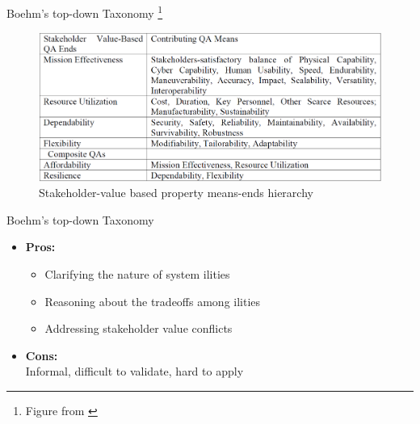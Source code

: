\documentclass[xcolor=x11names,compress]{beamer}
\renewcommand{\(}{\begin{columns}}
\renewcommand{\)}{\end{columns}}
\newcommand{\<}[1]{\begin{column}{#1}}
\renewcommand{\>}{\end{column}}
\begin{document}
\begin{frame}{Boehm's top-down Taxonomy \footnote{Figure from \cite{Boehm:ontology}}}
\begin{figure}
\includegraphics[scale=0.28]{figures/hierarchy}
\caption{Stakeholder-value based property means-ends hierarchy}
\end{figure}
\end{frame}


\begin{frame}{Boehm's top-down Taxonomy}
\begin{itemize}
\item \textbf{Pros:}
	\begin{itemize}
		\item Clarifying the nature of system ilities
		\item Reasoning about the tradeoffs among ilities
		\item Addressing stakeholder value conflicts
	\end{itemize}
\item \textbf{Cons:}\\
	Informal, difficult to validate, hard to apply
\end{itemize}
\end{frame}

\end{document}
